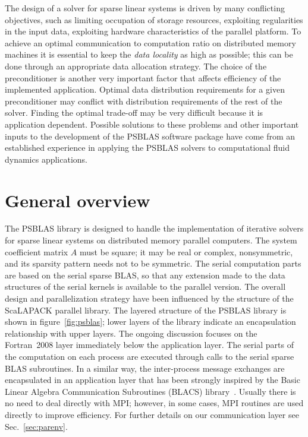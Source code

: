 The design of a solver for sparse linear systems is driven by many
conflicting objectives, such as limiting occupation of storage
resources, exploiting regularities in the input data, exploiting
hardware characteristics of the parallel platform.  To achieve an
optimal communication to computation ratio on distributed memory
machines it is essential to keep the {\em data locality} as high as
possible; this can be done through an appropriate data allocation
strategy.  The choice of the preconditioner is another very important
factor that affects efficiency of the implemented application. Optimal
data distribution requirements for a given preconditioner may conflict
with distribution requirements of the rest of the solver. Finding the
optimal trade-off may be very difficult because it is application
dependent.  Possible solutions to these problems and other important
inputs to the development of the PSBLAS software package have come from
an established experience in applying the PSBLAS solvers to
computational fluid dynamics applications.

\section{General overview}
\label{sec:overview} 
The PSBLAS library is designed to handle the implementation of
iterative solvers for sparse linear systems on distributed memory
parallel computers.  The system coefficient matrix $A$ must be square;
it may be real or complex, nonsymmetric, and its sparsity pattern
needs not to be symmetric.  The serial computation parts are based on
the serial sparse BLAS, so that any extension made to the data
structures of the serial kernels is available to the parallel
version. The overall design and parallelization strategy have been
influenced by the structure of the ScaLAPACK parallel
library.  The layered structure of the PSBLAS library
is shown in figure~\ref{fig:psblas}; lower layers of the library
indicate an encapsulation relationship with upper layers. The ongoing
discussion focuses on the Fortran~2008 layer immediately below the
application layer.
The serial parts of the computation on each process are executed through
calls to the serial sparse BLAS subroutines. 
In a similar way, the inter-process message exchanges are encapsulated
in an application layer that has been strongly inspired by the  Basic
Linear Algebra Communication Subroutines (BLACS) library~\cite{BLACS}.  
Usually  there is no need to deal directly with MPI;  however, in some
cases, MPI routines are used directly to improve efficiency. For
further details on our communication layer see Sec.~\ref{sec:parenv}.

